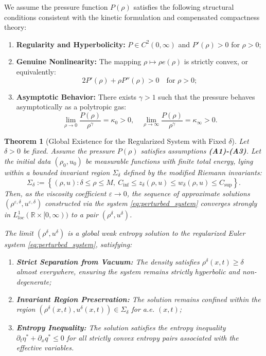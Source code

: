 \documentclass[12pt, reqno]{article}
\newtheorem{theorem}{Theorem}[section]
\theoremstyle{definition}
\numberwithin{equation}{section}
\begin{document}
We assume the pressure function $P(\rho)$ satisfies the following structural conditions consistent with the kinetic formulation and compensated compactness theory:
\begin{enumerate}[label=\textbf{(A\arabic*)}]
    \item \textbf{Regularity and Hyperbolicity:} $P \in C^2(0,\infty)$ and $P'(\rho) > 0$ for $\rho > 0$;
    \item \textbf{Genuine Nonlinearity:} The mapping $\rho \mapsto \rho e(\rho)$ is strictly convex, or equivalently:
    \begin{equation}
        2P'(\rho) + \rho P''(\rho) > 0 \quad \text{for } \rho > 0;
    \end{equation}
    \item \textbf{Asymptotic Behavior:} There exists $\gamma > 1$ such that the pressure behaves asymptotically as a polytropic gas:
    \begin{equation}
        \lim_{\rho \to 0} \frac{P(\rho)}{\rho^\gamma} = \kappa_0 > 0, \quad \lim_{\rho \to \infty} \frac{P(\rho)}{\rho^\gamma} = \kappa_\infty > 0.
    \end{equation}
\end{enumerate}

\begin{theorem}[Global Existence for the Regularized System with Fixed $\delta$]
\label{thm:fixed_delta}
Let $\delta > 0$ be fixed. Assume the pressure $P(\rho)$ satisfies assumptions \textbf{(A1)-(A3)}. Let the initial data $(\rho_0, u_0)$ be measurable functions with finite total energy, lying within a bounded invariant region $\Sigma_\delta$ defined by the modified Riemann invariants:
\begin{equation} \label{eq:invariant_region_delta}
    \Sigma_\delta := \left\{ (\rho, u) : \delta \le \rho \le M, \ C_{\inf} \le z_\delta(\rho,u) \le w_\delta(\rho,u) \le C_{\sup} \right\}.
\end{equation}
Then, as the viscosity coefficient $\varepsilon \to 0$, the sequence of approximate solutions $(\rho^{\varepsilon, \delta}, u^{\varepsilon, \delta})$ constructed via the system \eqref{eq:perturbed_system} converges strongly in $L^1_{loc}(\mathbb{R} \times [0, \infty))$ to a pair $(\rho^\delta, u^\delta)$.

The limit $(\rho^\delta, u^\delta)$ is a global weak entropy solution to the regularized Euler system \eqref{eq:perturbed_system}, satisfying:
\begin{enumerate}
    \item \textbf{Strict Separation from Vacuum:} The density satisfies $\rho^\delta(x,t) \ge \delta$ almost everywhere, ensuring the system remains strictly hyperbolic and non-degenerate;
    \item \textbf{Invariant Region Preservation:} The solution remains confined within the region $(\rho^\delta(x,t), u^\delta(x,t)) \in \Sigma_\delta$ for a.e. $(x,t)$;
    \item \textbf{Entropy Inequality:} The solution satisfies the entropy inequality $\partial_t \eta^* + \partial_x q^* \le 0$ for all strictly convex entropy pairs associated with the effective variables.
\end{enumerate}
\end{theorem}
\end{document}
